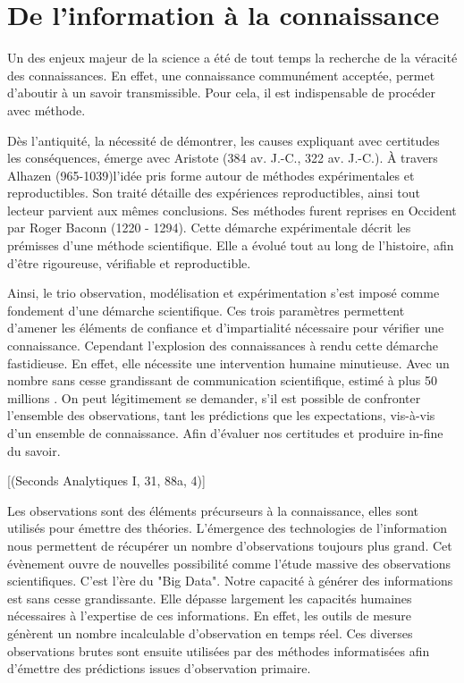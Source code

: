 \chapter*{De l'information à la connaissance}

Un des enjeux majeur de la science a été de tout temps la recherche de la véracité des connaissances. En effet, une connaissance communément acceptée, permet d'aboutir à un savoir transmissible. Pour cela, il est indispensable de procéder avec méthode.

Dès l'antiquité, la nécessité de démontrer, les causes expliquant avec certitudes les conséquences, émerge avec Aristote (384 av. J.-C., 322 av. J.-C.). À travers Alhazen (965-1039)l'idée pris forme autour de méthodes expérimentales et reproductibles. Son traité  détaille des expériences reproductibles, ainsi tout lecteur parvient aux mêmes conclusions. Ses méthodes furent reprises en Occident par Roger Baconn (1220 - 1294). Cette démarche expérimentale décrit les prémisses d'une méthode scientifique. Elle a évolué tout au long de l'histoire, afin d'être rigoureuse, vérifiable et reproductible.

Ainsi, le trio observation, modélisation et expérimentation s'est imposé comme fondement d'une démarche scientifique. Ces trois paramètres permettent d'amener les éléments de confiance et d'impartialité nécessaire pour vérifier une connaissance. Cependant l'explosion des connaissances à rendu cette démarche fastidieuse. En effet, elle nécessite une intervention humaine minutieuse. Avec un nombre sans cesse grandissant de communication scientifique, estimé à plus 50 millions \citep[voir][]{LEAP:LEAP0509}. On peut légitimement se demander, s'il est possible de confronter l'ensemble des observations, tant les prédictions que les expectations, vis-à-vis d'un ensemble de connaissance. Afin d'évaluer nos certitudes et produire in-fine du savoir.

[(Seconds Analytiques I, 31, 88a, 4)]

Les observations sont des éléments précurseurs à la connaissance, elles sont utilisés pour émettre des théories. L'émergence des technologies de l'information nous permettent de récupérer un nombre d'observations toujours plus grand. Cet évènement ouvre de nouvelles possibilité comme l'étude massive des observations scientifiques. C'est l'ère du "Big Data". Notre capacité à générer des informations est sans cesse grandissante. Elle dépasse largement les capacités humaines nécessaires à l'expertise de ces informations. En effet, les outils de mesure génèrent un nombre incalculable d'observation en temps réel. Ces diverses observations brutes sont ensuite utilisées par des méthodes informatisées afin d'émettre des prédictions issues d'observation primaire.


